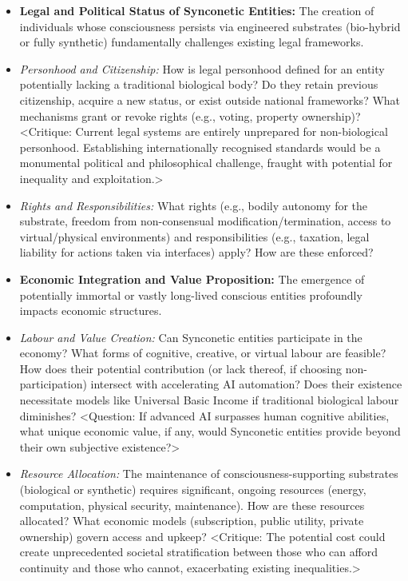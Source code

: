 \documentclass[10pt]{article}
\begin{document}
\begin{sloppypar}
  \begin{itemize}
    \item \textbf{Legal and Political Status of Synconetic Entities:} The creation of individuals whose consciousness persists via engineered substrates (bio-hybrid or fully synthetic) fundamentally challenges existing legal frameworks.
    \item \textit{Personhood and Citizenship:} How is legal personhood defined for an entity potentially lacking a traditional biological body? Do they retain previous citizenship, acquire a new status, or exist outside national frameworks? What mechanisms grant or revoke rights (e.g., voting, property ownership)? <Critique: Current legal systems are entirely unprepared for non-biological personhood. Establishing internationally recognised standards would be a monumental political and philosophical challenge, fraught with potential for inequality and exploitation.>
    \item \textit{Rights and Responsibilities:} What rights (e.g., bodily autonomy for the substrate, freedom from non-consensual modification/termination, access to virtual/physical environments) and responsibilities (e.g., taxation, legal liability for actions taken via interfaces) apply? How are these enforced?

    \item \textbf{Economic Integration and Value Proposition:} The emergence of potentially immortal or vastly long-lived conscious entities profoundly impacts economic structures.
    \item \textit{Labour and Value Creation:} Can Synconetic entities participate in the economy? What forms of cognitive, creative, or virtual labour are feasible? How does their potential contribution (or lack thereof, if choosing non-participation) intersect with accelerating AI automation? Does their existence necessitate models like Universal Basic Income if traditional biological labour diminishes? <Question: If advanced AI surpasses human cognitive abilities, what unique economic value, if any, would Synconetic entities provide beyond their own subjective existence?>
    \item \textit{Resource Allocation:} The maintenance of consciousness-supporting substrates (biological or synthetic) requires significant, ongoing resources (energy, computation, physical security, maintenance). How are these resources allocated? What economic models (subscription, public utility, private ownership) govern access and upkeep? <Critique: The potential cost could create unprecedented societal stratification between those who can afford continuity and those who cannot, exacerbating existing inequalities.>


\end{itemize}
\end{sloppypar}
\end{document}
